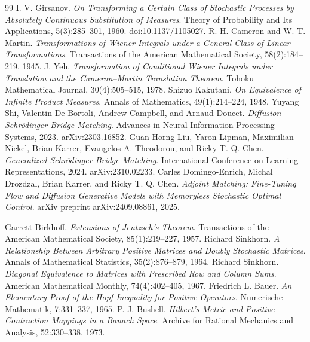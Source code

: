 \begin{thebibliography}{99}
 I. V. Girsanov. \emph{On Transforming a Certain Class of Stochastic Processes by Absolutely Continuous Substitution of Measures}. Theory of Probability and Its Applications, 5(3):285--301, 1960. doi:10.1137/1105027.
 R. H. Cameron and W. T. Martin. \emph{Transformations of Wiener Integrals under a General Class of Linear Transformations}. Transactions of the American Mathematical Society, 58(2):184--219, 1945.
 J. Yeh. \emph{Transformation of Conditional Wiener Integrals under Translation and the Cameron--Martin Translation Theorem}. Tohoku Mathematical Journal, 30(4):505--515, 1978.
 Shizuo Kakutani. \emph{On Equivalence of Infinite Product Measures}. Annals of Mathematics, 49(1):214--224, 1948.
 Yuyang Shi, Valentin De Bortoli, Andrew Campbell, and Arnaud Doucet. \emph{Diffusion Schr\"odinger Bridge Matching}. Advances in Neural Information Processing Systems, 2023. arXiv:2303.16852.
 Guan-Horng Liu, Yaron Lipman, Maximilian Nickel, Brian Karrer, Evangelos A. Theodorou, and Ricky T. Q. Chen. \emph{Generalized Schr\"odinger Bridge Matching}. International Conference on Learning Representations, 2024. arXiv:2310.02233.
 Carles Domingo-Enrich, Michal Drozdzal, Brian Karrer, and Ricky T. Q. Chen. \emph{Adjoint Matching: Fine-Tuning Flow and Diffusion Generative Models with Memoryless Stochastic Optimal Control}. arXiv preprint arXiv:2409.08861, 2025.

 Garrett Birkhoff. \emph{Extensions of Jentzsch's Theorem}. Transactions of the American Mathematical Society, 85(1):219--227, 1957.
 Richard Sinkhorn. \emph{A Relationship Between Arbitrary Positive Matrices and Doubly Stochastic Matrices}. Annals of Mathematical Statistics, 35(2):876--879, 1964.
 Richard Sinkhorn. \emph{Diagonal Equivalence to Matrices with Prescribed Row and Column Sums}. American Mathematical Monthly, 74(4):402--405, 1967.
 Friedrich L. Bauer. \emph{An Elementary Proof of the Hopf Inequality for Positive Operators}. Numerische Mathematik, 7:331--337, 1965.
 P. J. Bushell. \emph{Hilbert's Metric and Positive Contraction Mappings in a Banach Space}. Archive for Rational Mechanics and Analysis, 52:330--338, 1973.


\end{thebibliography}
